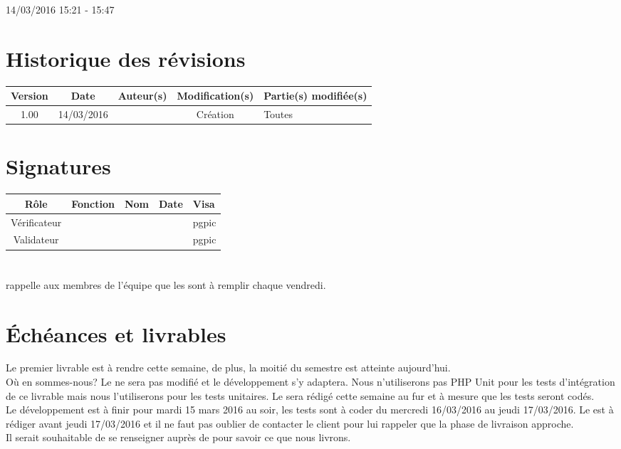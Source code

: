 \documentclass [a4paper] {article}
\begin{document}
14/03/2016			 				%
\hfill   
\hfill 	 15:21 - 15:47 				%



\section*{Historique des révisions}
\begin{center}
			\begin{tabular}{| c | c | c | c | p{4cm} |}
				\hline
				\rowcolor{Gray}
				Version & Date & Auteur(s) & Modification(s) & Partie(s) modifiée(s)		 \\
				\hline
				1.00 & 14/03/2016 & \Pierre & Création & Toutes \\
		\hline		
			\end{tabular}
		\end{center}

\section*{Signatures}

		\begin{center}
			\begin{tabular}{| c | c | c | c | p{4cm} |}
				\hline
				\rowcolor{Gray}
				Rôle & Fonction & Nom & Date & Visa		 \\
				\hline
				Vérificateur & \RQA & \Kafui &  & pgpic \\[30pt]
				\hline
				Validateur & \CP & \Sergi &  & pgpic \\[30pt]	
				\hline
			\end{tabular}
		\end{center}
		
\newpage		



\section{\FS}
\Sergi{} rappelle aux membres de l'équipe que les \FS{} sont à remplir chaque vendredi.

\section{Échéances et livrables}
Le premier livrable est à rendre cette semaine, de plus, la moitié du semestre est atteinte aujourd'hui. \\
Où en sommes-nous? Le \PTI{} ne sera pas modifié et le développement s'y adaptera. Nous n'utiliserons pas PHP Unit pour les tests d'intégration de ce livrable mais nous l'utiliserons pour les tests unitaires. Le \PTU{} sera rédigé cette semaine au fur et à mesure que les tests seront codés. \\
Le développement est à finir pour mardi 15 mars 2016 au soir, les tests sont à coder du mercredi 16/03/2016 au jeudi 17/03/2016. Le \CDR{} est à rédiger avant jeudi 17/03/2016 et il ne faut pas oublier de contacter le client pour lui rappeler que la phase de livraison approche. \\
Il serait souhaitable de se renseigner auprès de \nomTuteurPedago{} pour savoir ce que nous livrons.
\end{document}
